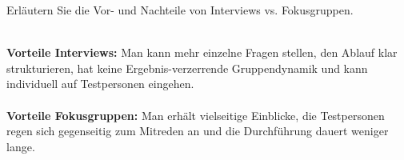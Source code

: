 \begin{exercise}
  Erläutern Sie die Vor- und Nachteile von Interviews vs. Fokusgruppen.
  \\\\
\end{exercise}
\textbf{Vorteile Interviews:}
Man kann mehr einzelne Fragen stellen,
den Ablauf klar strukturieren,
hat keine Ergebnis-verzerrende Gruppendynamik und kann individuell auf Testpersonen eingehen.
\\\\
\textbf{Vorteile Fokusgruppen:}
Man erhält vielseitige Einblicke, die Testpersonen regen sich gegenseitig zum Mitreden an und die Durchführung dauert weniger lange.

